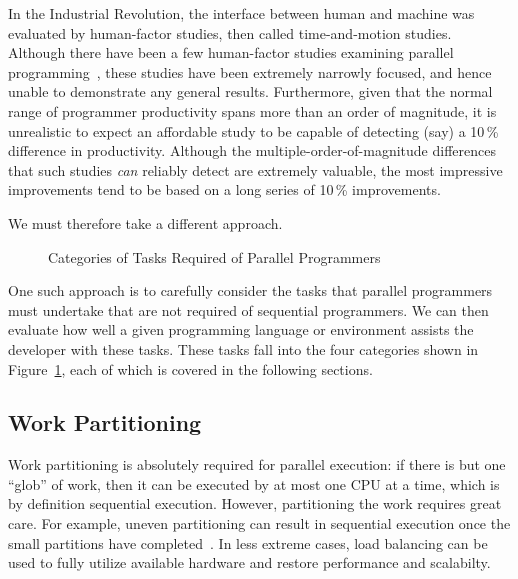 In the Industrial Revolution, the interface between human and machine
was evaluated by human-factor studies, then called time-and-motion
studies.
Although there have been a few human-factor studies examining parallel
programming~\cite{RyanEccles2005HPCSNovice,RyanEccles2006HPCSNoviceNeeds,
LorinHochstein2005SC,DuaneSzafron1994PEMPDS}, these studies have
been extremely narrowly focused, and hence unable to demonstrate any
general results.
Furthermore, given that the normal range of programmer productivity
spans more than an order of magnitude, it is unrealistic to expect
an affordable study to be capable of detecting (say) a 10\,\% difference
in productivity.
Although the multiple-order-of-magnitude differences that such studies
\emph{can} reliably detect are extremely valuable, the most impressive
improvements tend to be based on a long series of 10\,\% improvements.

We must therefore take a different approach.

\begin{figure}
\centering
{}
\caption{Categories of Tasks Required of Parallel Programmers}
\label{fig:intro:Categories of Tasks Required of Parallel Programmers}
\end{figure}

One such approach is to carefully consider the tasks that parallel
programmers must undertake that are not required of sequential programmers.
We can then evaluate how well a given programming language or environment
assists the developer with these tasks.
These tasks fall into the four categories shown in
Figure~\ref{fig:intro:Categories of Tasks Required of Parallel Programmers},
each of which is covered in the following sections.

\subsection{Work Partitioning}
\label{sec:intro:Work Partitioning}

Work partitioning is absolutely required for parallel execution:
if there is but one ``glob'' of work, then it can be executed by at
most one CPU at a time, which is by definition sequential execution.
However, partitioning the work requires great care.
For example, uneven partitioning can result in sequential execution
once the small partitions have completed~\cite{GeneAmdahl1967AmdahlsLaw}.
In less extreme cases, load balancing can be used to fully utilize
available hardware and restore performance and scalabilty.

